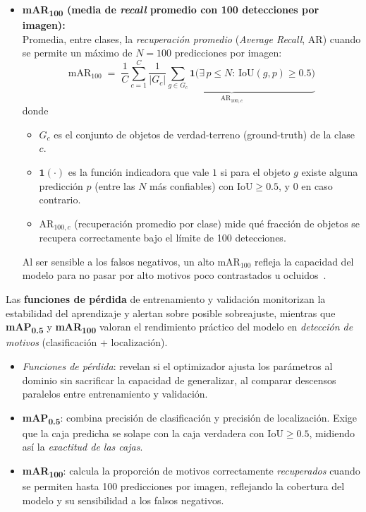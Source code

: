 \begin{itemize}
    \item \textbf{mAR\textsubscript{100} (media de \emph{recall} promedio con 100 detecciones por imagen):}\\[2pt]
      Promedia, entre clases, la \emph{recuperación promedio} (\textit{Average Recall}, $\mathrm{AR}$) cuando se permite un máximo de $N=100$ predicciones por imagen:
      \[
      \text{mAR}_{100}
      \;=\;
      \frac{1}{C}\sum_{c=1}^{C}
      \underbrace{\frac{1}{|G_c|}
      \sum_{g\in G_c}\!
      \mathbf{1}\bigl(
          \exists\,p\le N:\,\text{IoU}(g,p)\ge 0.5
      \bigr)}_{\mathrm{AR}_{100,c}}
      \]
      donde
      \begin{itemize}
        \item $G_c$ es el conjunto de objetos de verdad-terreno (ground-truth) de la clase $c$.
        \item $\mathbf{1}(\cdot)$ es la función indicadora que vale $1$ si para el objeto $g$ existe alguna predicción $p$ (entre las $N$ más confiables) con $\text{IoU}\ge 0.5$, y $0$ en caso contrario.
        \item $\mathrm{AR}_{100,c}$ (recuperación promedio por clase) mide qué fracción de objetos se recupera correctamente bajo el límite de 100 detecciones.
      \end{itemize}
      Al ser sensible a los falsos negativos, un alto $\text{mAR}_{100}$ refleja la capacidad del modelo para no pasar por alto motivos poco contrastados u ocluidos~\cite{cocoEval2015}.
\end{itemize}

Las \textbf{funciones de pérdida} de entrenamiento y validación monitorizan la estabilidad del aprendizaje y alertan sobre posible sobreajuste, mientras que \textbf{mAP\textsubscript{0.5}} y \textbf{mAR\textsubscript{100}} valoran el rendimiento práctico del modelo en \emph{detección de motivos} (clasificación + localización).

\begin{itemize}
    \item \emph{Funciones de pérdida}: revelan si el optimizador ajusta los parámetros al dominio sin sacrificar la capacidad de generalizar, al comparar descensos paralelos entre entrenamiento y validación.
    \item \textbf{mAP\textsubscript{0.5}}: combina precisión de clasificación y precisión de localización.
    Exige que la caja predicha se solape con la caja verdadera con $\text{IoU}\ge 0.5$, midiendo así la \emph{exactitud de las cajas}.
    \item \textbf{mAR\textsubscript{100}}: calcula la proporción de motivos correctamente \emph{recuperados} cuando se permiten hasta 100 predicciones por imagen, reflejando la cobertura del modelo y su sensibilidad a los falsos negativos.
\end{itemize}

